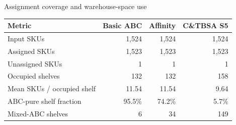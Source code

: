 \documentclass[aspectratio=169,10pt]{beamer}
\begin{document}
\begin{frame}{Assignment coverage and warehouse-space use}
  \small
  \centering
  \begin{tabular}{@{}lrrr@{}}
    \toprule
    \textbf{Metric} & \textbf{Basic ABC} & \textbf{Affinity} & \textbf{C\&TBSA S5}\\
    \midrule
    Input SKUs & 1,524 & 1,524 & 1,524\\
    Assigned SKUs & 1,523 & 1,523 & 1,523\\
    Unassigned SKUs & 1 & 1 & 1\\
    Occupied shelves & \cellcolor{Green!12}132 & \cellcolor{Green!12}132 & 158\\
    Mean SKUs / occupied shelf & \cellcolor{Green!12}11.54 & \cellcolor{Green!12}11.54 & 9.64\\
    ABC-pure shelf fraction & \cellcolor{Green!12}95.5\% & 74.2\% & 5.7\%\\
    Mixed-ABC shelves & \cellcolor{Green!12}6 & 34 & 149\\
    \bottomrule
  \end{tabular}
  \vspace{0.45cm}
\end{frame}
\end{document}
